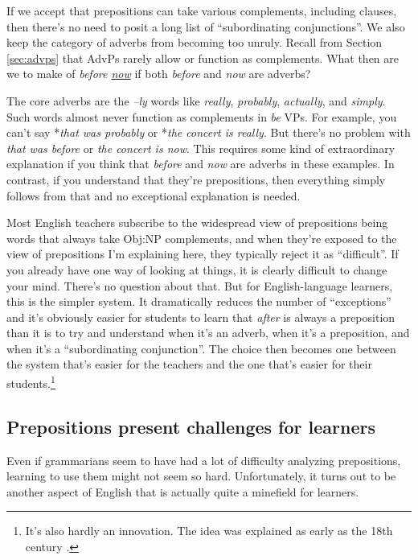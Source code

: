 If we accept that prepositions can take various complements, including clauses, then there's no need to posit a long list of ``subordinating conjunctions''. We also keep the category of adverbs from becoming too unruly. Recall from Section \ref{sec:advps} that AdvPs rarely allow or function as complements. What then are we to make of \textit{before \uline{now}} if both \textit{before} and \textit{now} are adverbs? 

The core adverbs are the \textit{--ly} words like \textit{really}, \textit{probably}, \textit{actually}, and \textit{simply}. Such words almost never function as complements in \textit{be} VPs. For example, you can't say *\textit{that was probably} or *\textit{the concert is really}. But there's no problem with \textit{that was before} or \textit{the concert is now}. This requires some kind of extraordinary explanation if you think that \textit{before} and \textit{now} are adverbs in these examples. In contrast, if you understand that they're prepositions, then everything simply follows from that and no exceptional explanation is needed.

Most English teachers subscribe to the widespread view of prepositions being words that always take Obj:NP complements, and when they're exposed to the view of prepositions I'm explaining here, they typically reject it as ``difficult''. If you already have one way of looking at things, it is clearly difficult to change your mind. There's no question about that. But for English-language learners, this is the simpler system. It dramatically reduces the number of ``exceptions'' and it's obviously easier for students to learn that \textit{after} is always a preposition than it is to try and understand when it's an adverb, when it's a preposition, and when it's a ``subordinating conjunction''. The choice then becomes one between the system that's easier for the teachers and the one that's easier for their students.\footnote{It's also hardly an innovation. The idea was explained as early as the 18th century \citep{Hunter1784}.}


\subsection{Prepositions present challenges for learners}

Even if grammarians seem to have had a lot of difficulty analyzing prepositions, learning to use them might not seem so hard. Unfortunately, it turns out to be another aspect of English that is actually quite a minefield for learners.

